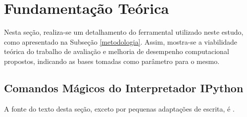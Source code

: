 \documentclass[12pt]{article}
\begin{document}



\section{Fundamentação Teórica}
\label{fundamentacao}

Nesta seção, realiza-se um detalhamento do ferramental utilizado neste estudo, como apresentado na Subseção \ref{metodologia}. Assim, mostra-se a viabilidade teórica do trabalho de avaliação e melhoria de desempenho computacional propostos, indicando as bases tomadas como parâmetro para o mesmo.

\subsection{Comandos Mágicos do Interpretador IPython}

A fonte do texto desta seção, exceto por pequenas adaptações de escrita, é \cite{mckinney:2018}.

%
\end{document}
